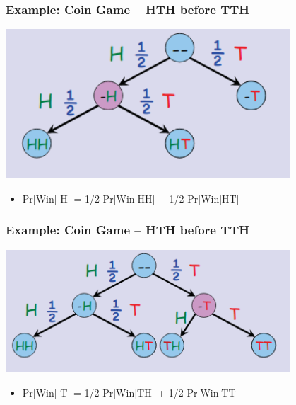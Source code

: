 \documentclass{beamer}
\begin{document}
\begin{frame}
  \frametitle{Example: Coin Game -- HTH before TTH}
  \begin{center}
    \includegraphics[width=0.8\textwidth]{../img/hth_2}
  \end{center}

  {\larger
    \begin{itemize}
    \item Pr[Win|-H] = 1/2 Pr[Win|HH] + 1/2 Pr[Win|HT]
    \end{itemize}
  }
\end{frame}

\begin{frame}
  \frametitle{Example: Coin Game -- HTH before TTH}
  \begin{center}
    \includegraphics[width=0.8\textwidth]{../img/hth_3}
  \end{center}

  {\larger
    \begin{itemize}
    \item Pr[Win|-T] = 1/2 Pr[Win|TH] + 1/2 Pr[Win|TT]
    \end{itemize}
  }
\end{frame}
\end{document}

